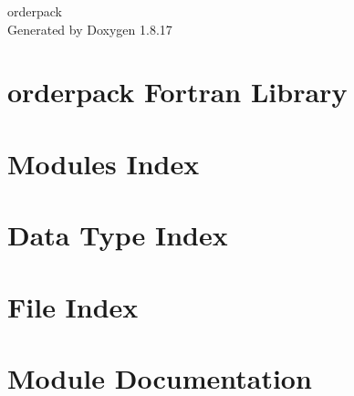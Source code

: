 \let\mypdfximage\pdfximage\def\pdfximage{\immediate\mypdfximage}\documentclass[twoside]{book}
\newcommand{\+}{\discretionary{\mbox{\scriptsize$\hookleftarrow$}}{}{}}
\newcommand{\clearemptydoublepage}{%
  \newpage{\pagestyle{empty}\cleardoublepage}%
}
\begin{document}
\hypersetup{pageanchor=false,
             bookmarksnumbered=true,
             pdfencoding=unicode
            }
\begin{titlepage}
\vspace*{7cm}
\begin{center}%
{\Large orderpack }\\
\vspace*{1cm}
{\large Generated by Doxygen 1.8.17}\\
\end{center}
\end{titlepage}
\clearemptydoublepage
{}
\tableofcontents
\clearemptydoublepage
{}
\hypersetup{pageanchor=true}

\chapter{orderpack Fortran Library}
\label{index}\hypertarget{index}{}
\chapter{Modules Index}

\chapter{Data Type Index}

\chapter{File Index}

\chapter{Module Documentation}






















\end{document}

